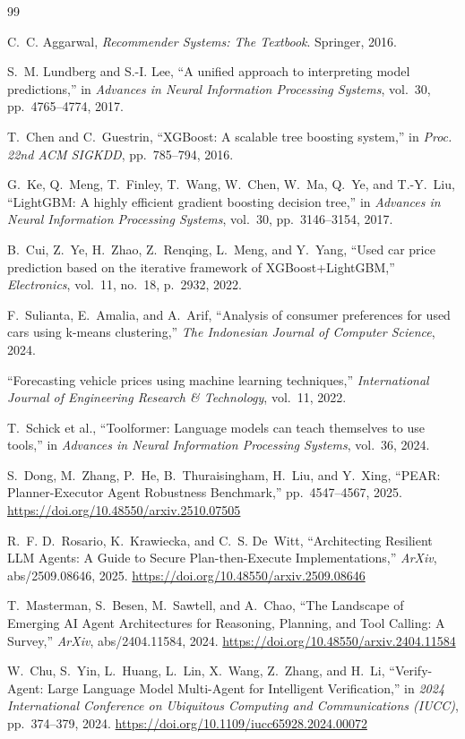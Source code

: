 \documentclass[conference]{IEEEtran}
\begin{document}
\begin{thebibliography}{99}

C.~C. Aggarwal,
\textit{Recommender Systems: The Textbook}.
Springer, 2016.

S.~M. Lundberg and S.-I. Lee,
``A unified approach to interpreting model predictions,''
in \textit{Advances in Neural Information Processing Systems},
vol.~30, pp.~4765--4774, 2017.

T.~Chen and C.~Guestrin,
``XGBoost: A scalable tree boosting system,''
in \textit{Proc. 22nd ACM SIGKDD}, pp.~785--794, 2016.

G.~Ke, Q.~Meng, T.~Finley, T.~Wang, W.~Chen, W.~Ma, Q.~Ye, and T.-Y.~Liu,
``LightGBM: A highly efficient gradient boosting decision tree,''
in \textit{Advances in Neural Information Processing Systems},
vol.~30, pp.~3146--3154, 2017.

B.~Cui, Z.~Ye, H.~Zhao, Z.~Renqing, L.~Meng, and Y.~Yang,
``Used car price prediction based on the iterative framework of
XGBoost+LightGBM,''
\textit{Electronics}, vol.~11, no.~18, p.~2932, 2022.

F.~Sulianta, E.~Amalia, and A.~Arif,
``Analysis of consumer preferences for used cars using k-means clustering,''
\textit{The Indonesian Journal of Computer Science}, 2024.

``Forecasting vehicle prices using machine learning techniques,''
\textit{International Journal of Engineering Research \& Technology},
vol.~11, 2022.

T.~Schick et al.,
``Toolformer: Language models can teach themselves to use tools,''
in \textit{Advances in Neural Information Processing Systems},
vol.~36, 2024.

S.~Dong, M.~Zhang, P.~He, B.~Thuraisingham, H.~Liu, and Y.~Xing,
``PEAR: Planner-Executor Agent Robustness Benchmark,''
pp.~4547--4567, 2025.
\url{https://doi.org/10.48550/arxiv.2510.07505}

R.~F. D.~Rosario, K.~Krawiecka, and C.~S. De~Witt,
``Architecting Resilient LLM Agents: A Guide to Secure 
Plan-then-Execute Implementations,''
\textit{ArXiv}, abs/2509.08646, 2025.
\url{https://doi.org/10.48550/arxiv.2509.08646}

T.~Masterman, S.~Besen, M.~Sawtell, and A.~Chao,
``The Landscape of Emerging AI Agent Architectures for Reasoning, 
Planning, and Tool Calling: A Survey,''
\textit{ArXiv}, abs/2404.11584, 2024.
\url{https://doi.org/10.48550/arxiv.2404.11584}

W.~Chu, S.~Yin, L.~Huang, L.~Lin, X.~Wang, Z.~Zhang, and H.~Li,
``Verify-Agent: Large Language Model Multi-Agent for Intelligent 
Verification,''
in \textit{2024 International Conference on Ubiquitous Computing 
and Communications (IUCC)}, pp.~374--379, 2024.
\url{https://doi.org/10.1109/iucc65928.2024.00072}

\end{thebibliography}
\end{document}
